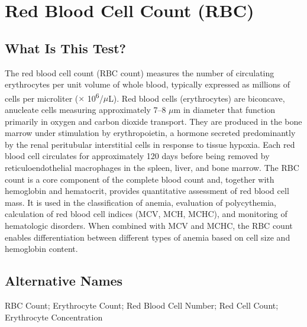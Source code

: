 \chapter{Red Blood Cell Count (RBC)}

\section*{What Is This Test?}
The red blood cell count (RBC count) measures the number of circulating erythrocytes per unit volume of whole blood, typically expressed as millions of cells per microliter ($\times$ 10\textsuperscript{6}/$\mu$L). Red blood cells (erythrocytes) are biconcave, anucleate cells measuring approximately 7--8 $\mu$m in diameter that function primarily in oxygen and carbon dioxide transport. They are produced in the bone marrow under stimulation by erythropoietin, a hormone secreted predominantly by the renal peritubular interstitial cells in response to tissue hypoxia. Each red blood cell circulates for approximately 120 days before being removed by reticuloendothelial macrophages in the spleen, liver, and bone marrow. The RBC count is a core component of the complete blood count and, together with hemoglobin and hematocrit, provides quantitative assessment of red blood cell mass. It is used in the classification of anemia, evaluation of polycythemia, calculation of red blood cell indices (MCV, MCH, MCHC), and monitoring of hematologic disorders. When combined with MCV and MCHC, the RBC count enables differentiation between different types of anemia based on cell size and hemoglobin content.

\section*{Alternative Names}
RBC Count; Erythrocyte Count; Red Blood Cell Number; Red Cell Count; Erythrocyte Concentration

